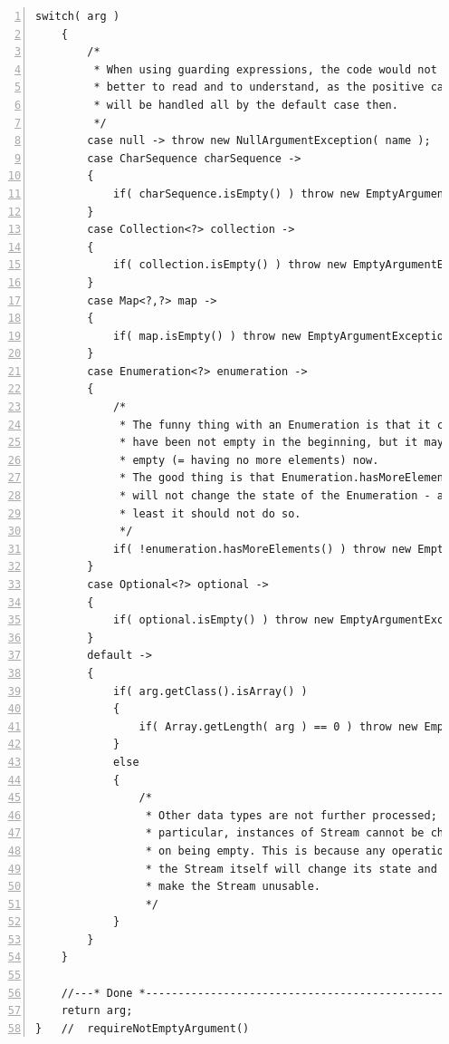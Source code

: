 \documentclass[11pt,a4paper, titlepage, parskip=half, headsepline, footsepline, cleardoublepage=current, headheight=1cm]{scrbook}
\begin{document}
\begin{lstlisting}[numbers=left,caption={requireNotEmptyArgument()},label={listing:requireNotEmptyArgument}]
    switch( arg )
    {
        /*
         * When using guarding expressions, the code would not get
         * better to read and to understand, as the positive cases
         * will be handled all by the default case then.
         */
        case null -> throw new NullArgumentException( name );
        case CharSequence charSequence ->
        {
            if( charSequence.isEmpty() ) throw new EmptyArgumentException( name );
        }
        case Collection<?> collection ->
        {
            if( collection.isEmpty() ) throw new EmptyArgumentException( name );
        }
        case Map<?,?> map ->
        {
            if( map.isEmpty() ) throw new EmptyArgumentException( name );
        }
        case Enumeration<?> enumeration ->
        {
            /*
             * The funny thing with an Enumeration is that it could 
             * have been not empty in the beginning, but it may be 
             * empty (= having no more elements) now.
             * The good thing is that Enumeration.hasMoreElements() 
             * will not change the state of the Enumeration - at 
             * least it should not do so.
             */
            if( !enumeration.hasMoreElements() ) throw new EmptyArgumentException( name );
        }
        case Optional<?> optional ->
        {
            if( optional.isEmpty() ) throw new EmptyArgumentException( name );
        }
        default ->
        {
            if( arg.getClass().isArray() )
            {
                if( Array.getLength( arg ) == 0 ) throw new EmptyArgumentException( name );
            }
            else
            {
                /*
                 * Other data types are not further processed; in
                 * particular, instances of Stream cannot be checked 
                 * on being empty. This is because any operation on 
                 * the Stream itself will change its state and may 
                 * make the Stream unusable.
                 */
            }
        }
    }

    //---* Done *----------------------------------------------------------
    return arg;
}   //  requireNotEmptyArgument()
\end{lstlisting}
\end{document}
